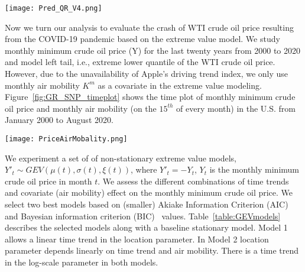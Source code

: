 \documentclass[review]{elsarticle}
\begin{document}
\begin{figure*}[!ht]
\centering
  \texttt{[image: Pred\_QR\_V4.png]}
	\caption{Normalize WTI crude oil prices regression models for different quantile levels.}
	\label{fig:QR2}
\end{figure*}




Now we turn our analysis to evaluate the crash of WTI crude oil price resulting from the COVID-19 pandemic based on the extreme value model. We study monthly minimum crude oil price (Y) for the last twenty years from 2000 to 2020 and model left tail, i.e., extreme lower quantile of the WTI crude oil price.
However, due to the unavailability of Apple's driving trend index, we only use monthly air mobility $K^m$ as a covariate in the extreme value modeling. Figure~\ref{fig:GR_SNP_timeplot} shows the time plot of monthly minimum crude oil price and monthly air mobility (on the $15^{th}$ of every month) in the U.S. from January 2000 to August 2020.

\begin{figure*}[!ht]
\centering
  \texttt{[image: PriceAirMobality.png]}
	\caption{Monthly minimum crude oil price and monthly air mobility from January 2000 to August 2020.}
	\label{fig:GR_SNP_timeplot}
\end{figure*}







We experiment a set of of non-stationary extreme value models, $Y'_t \sim GEV(\mu(t), \sigma(t),  \xi(t))$, where $Y'_t=-Y_t$, $Y_t$ is the monthly minimum crude oil price in month $t$.
We assess the different combinations of time trends and covariate (air mobility) effect on the monthly minimum crude oil price. We select two best models based on  (smaller) Akiake Information Criterion (AIC)~\citep{Akaike1998} 
and Bayesian information criterion (BIC)~\citep{schwarz1978} values.
Table~\ref{table:GEVmodels} describes the selected models along with a baseline stationary model.
Model 1 allows a linear time trend in the location parameter. In Model 2 location parameter depends linearly on time trend and air mobility. There is a time trend in the log-scale parameter in both models.
\end{document}
